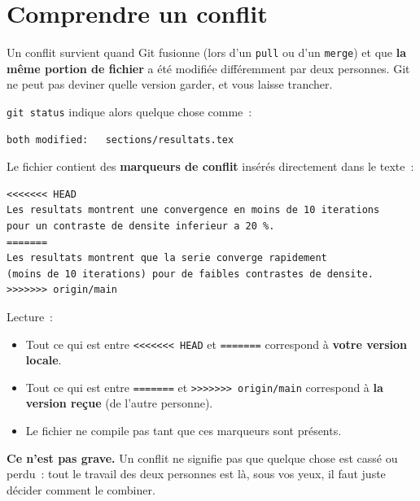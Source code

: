 \documentclass[11pt,a4paper]{article}
\begin{document}

\section{Comprendre un conflit}

Un conflit survient quand Git fusionne (lors d'un \texttt{pull} ou d'un \texttt{merge}) et que \textbf{la même portion de fichier} a été modifiée différemment par deux personnes. Git ne peut pas deviner quelle version garder, et vous laisse trancher.

\texttt{git status} indique alors quelque chose comme~:

\begin{lstlisting}[style=plainstyle]
both modified:   sections/resultats.tex
\end{lstlisting}

Le fichier contient des \textbf{marqueurs de conflit} insérés directement dans le texte~:

\begin{lstlisting}[style=plainstyle]
<<<<<<< HEAD
Les resultats montrent une convergence en moins de 10 iterations
pour un contraste de densite inferieur a 20 %.
=======
Les resultats montrent que la serie converge rapidement
(moins de 10 iterations) pour de faibles contrastes de densite.
>>>>>>> origin/main
\end{lstlisting}

Lecture~:
\begin{itemize}
  \item Tout ce qui est entre \texttt{<<<<<<< HEAD} et \texttt{=======} correspond à \textbf{votre version locale}.
  \item Tout ce qui est entre \texttt{=======} et \texttt{>>>>>>> origin/main} correspond à \textbf{la version reçue} (de l'autre personne).
  \item Le fichier ne compile pas tant que ces marqueurs sont présents.
\end{itemize}

\textbf{Ce n'est pas grave.} Un conflit ne signifie pas que quelque chose est cassé ou perdu~: tout le travail des deux personnes est là, sous vos yeux, il faut juste décider comment le combiner.
\end{document}
